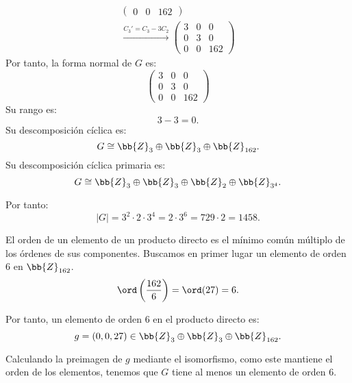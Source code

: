 \begin{ejercicio}
\begin{enumerate}
\begin{multline*}
\begin{pmatrix}
                0 & 0 & 162
            \end{pmatrix}\\
            \xrightarrow{C_3'=C_3-3C_2}
            \begin{pmatrix}
                3 & 0 & 0 \\
                0 & 3 & 0 \\
                0 & 0 & 162
            \end{pmatrix}
        \end{multline*}
        Por tanto, la forma normal de $G$ es:
        \begin{equation*}
            \begin{pmatrix}
                3 & 0 & 0 \\
                0 & 3 & 0 \\
                0 & 0 & 162
            \end{pmatrix}
        \end{equation*}
        Su rango es:
        \begin{equation*}
            3-3= 0.
        \end{equation*}
        Su descomposición cíclica es:
        \begin{equation*}
            G \cong \bb{Z}_3 \oplus \bb{Z}_3 \oplus \bb{Z}_{162}.
        \end{equation*}
        Su descomposición cíclica primaria es:
        \begin{equation*}
            G \cong \bb{Z}_3 \oplus \bb{Z}_3 \oplus \bb{Z}_2 \oplus \bb{Z}_{3^4}.
        \end{equation*}

        Por tanto:
        \begin{equation*}
            |G|= 3^2 \cdot 2\cdot 3^4 = 2 \cdot 3^6 = 729\cdot 2 = 1458.
        \end{equation*}

        El orden de un elemento de un producto directo es el mínimo común múltiplo de los órdenes de sus componentes. Buscamos en primer lugar un elemento de orden $6$ en $\bb{Z}_{162}$.
        \begin{equation*}
            \ord\left(\frac{162}{6}\right) = \ord(27) = 6.
        \end{equation*}

        Por tanto, un elemento de orden $6$ en el producto directo es:
        \begin{equation*}
            g = (0, 0, 27) \in \bb{Z}_3 \oplus \bb{Z}_3 \oplus \bb{Z}_{162}.
        \end{equation*}

        Calculando la preimagen de $g$ mediante el isomorfismo, como este mantiene el orden de los elementos, tenemos que $G$ tiene al menos un elemento de orden $6$.
    \end{enumerate}
\end{ejercicio}

